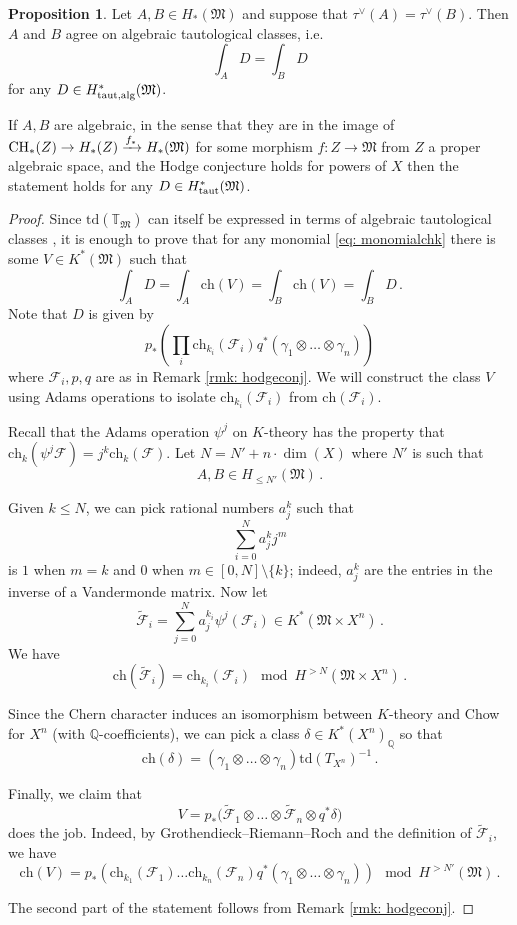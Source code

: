 \documentclass[12pt]{amsart}
\theoremstyle{definition}
\newtheorem{proposition}[definition]{Proposition}
\newcommand{\BQ}{{\mathbb{Q}}}
\newcommand{\BT}{{\mathbb{T}}}
\newcommand{\CF}{{\mathcal F}}
\newcommand{\1}{\mathbf 1}
\newcommand{\FM}{{\mathfrak{M}}}
\newcommand{\ch}{\mathrm{ch}}
\newcommand{\td}{\mathrm{td}}
\begin{document}
\begin{proposition}\label{prop: injectivityhomlift}
    Let $A, B\in H_\ast(\FM)$ and suppose that $\tau^\vee(A)=\tau^\vee(B)$. Then $A$ and $B$ agree on algebraic tautological classes, i.e. 
    \[\int_A D=\int_B D\]
    for any $D\in H^\ast_{\textup{taut,alg}}(\FM)$.

    If $A, B$ are algebraic, in the sense that they are in the image of $\textup{CH}_\ast(Z)\to H_\ast(Z)\xrightarrow{f_\ast} H_\ast(\FM)$ for some morphism $f\colon Z\to \FM$ from $Z$ a proper algebraic space, and the Hodge conjecture holds for powers of $X$ then the statement holds for any $D\in H^\ast_{\textup{taut}}(\FM)$.
\end{proposition}
\begin{proof}
    Since $\td(\BT_\FM)$ can itself be expressed in terms of algebraic tautological classes \cite[Proposition 3.3]{shencobordism}, it is enough to prove that for any monomial \eqref{eq: monomialchk} there is some $V\in K^\ast(\FM)$ such that
    \[\int_A D=\int_A \ch(V)=\int_B \ch(V)=\int_B D\,.\]
    Note that $D$ is given by
    \[p_\ast\left( \prod_{i}\ch_{k_i}(\CF_i)q^\ast (\gamma_1\otimes \ldots \otimes \gamma_n)\right)\]
    where $\CF_i, p, q$ are as in Remark \ref{rmk: hodgeconj}. We will construct the class $V$ using Adams operations to isolate $\ch_{k_i}(\CF_i)$ from $\ch(\CF_i)$.

    Recall that the Adams operation $\psi^j$ on $K$-theory has the property that $\ch_k(\psi^j \CF)=j^k \ch_k(\CF)$. Let $N=N'+n\cdot \dim(X)$ where $N'$ is such that  
    \[A, B\in H_{\leq N'}(\FM)\,.\]

    Given $k\leq N$, we can pick rational numbers $a_j^k$ such that 
    \[\sum_{i=0}^N a_j^k j^m\]
    is $1$ when $m=k$ and $0$ when $m\in [0,N]\setminus \{k\}$; indeed, $a_{j}^k$ are the entries in the inverse of a Vandermonde matrix. Now let 
    \[\widetilde \CF_i=\sum_{j=0}^N a_j^{k_i}\psi^j(\CF_i)\in K^\ast(\FM\times X^n)\,.\]
    We have
    \[\ch(\widetilde \CF_i)=\ch_{k_i}(\CF_i) \mod H^{>N}(\FM\times X^n)\,.\]

Since the Chern character induces an isomorphism between $K$-theory and Chow for $X^n$ (with $\BQ$-coefficients), we can pick a class $\delta\in K^\ast(X^n)_\BQ$ so that
\[\ch(\delta)=(\gamma_1\otimes\ldots \otimes \gamma_n)\td(T_{X^n})^{-1}\,.\]

Finally, we claim that
\[V=p_\ast\big(\widetilde \CF_1\otimes \ldots\otimes \widetilde \CF_n \otimes q^\ast \delta\big)\]
does the job. Indeed, by Grothendieck--Riemann--Roch and the definition of $\widetilde \CF_i$, we have
\[\ch(V)=p_\ast(\ch_{k_1}(\CF_1)\ldots \ch_{k_n}(\CF_n)q^\ast (\gamma_1\otimes\ldots \otimes \gamma_n)) \mod H^{>N'}(\FM)\,.\]

 The second part of the statement follows from Remark \ref{rmk: hodgeconj}. \qedhere
\end{proof}
\end{document}
